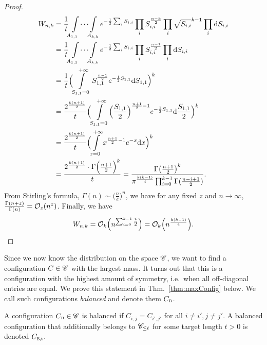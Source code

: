 \begin{proof}
	\begin{align*}
		W_{n,k} &= \frac{1}{t} \idotsint\limits_{A_{1,1}\hspace{1.3em}A_{k,k}} e^{-\frac12\sum_i S_{i,i}} \prod_i S_{i,i}^{\frac{n-k}{2}} \prod_i\sqrt{S_{i,i}}^{k-1}\prod_i \mathrm{d} S_{i,i} \\
		&=\frac{1}{t} \idotsint\limits_{A_{1,1}\hspace{1.3em}A_{k,k}}e^{-\frac12\sum_i S_{i,i}} \prod_i S_{i,i}^{\frac{n-1}{2}}\prod_i \mathrm{d} S_{i,i} \\
		&=\frac{1}{t} \Bigl( \int\limits_{S_{1,1}=0}^{+ \infty} S_{1,1}^{\frac{n-1}{2}} e^{-\frac12 S_{1,1}} \mathrm{d} S_{1,1}\Bigr)^k \\
		&=\frac{2^{\frac{k(n+1)}{2}}}{t} \Bigl( \int\limits_{S_{1,1}=0}^{+ \infty} \Bigl( \frac{S_{1,1}}{2} \Bigr)^{\frac{n+1}{2} - 1} e^{-\frac12 S_{1,1}} \mathrm{d} \frac{S_{1,1}}{2}\Bigr)^k \\
		&=\frac{2^{\frac{k(n+1)}{2}}}{t} \Bigl( \int\limits_{x=0}^{+ \infty} x^{\frac{n+1}{2}-1} e^{-x} \mathrm{d} x \Bigr)^k \\
		&=\frac{2^{\frac{k(n+1)}{2}} \cdot \Gamma \Bigl( \frac{n+1}{2} \Bigr)^k}{t}
		=\frac{\Gamma \bigl( \frac{n+1}{2} \bigr)^k}{\pi^{\frac{k(k-1)}{4}} \prod_{i=0}^{k-1} \Gamma(\frac{n-i+1}{2} )}.
	\end{align*}
	From Stirling's formula, $\Gamma(n) \sim \bigl( \tfrac{n}{e} \bigr)^n$, we have for any fixed $z$ and $n \rightarrow \infty$, $\frac{\Gamma(n+z)}{\Gamma(n)} = \mathcal{O}_z(n^z)$. Finally, we have
	\[
		W_{n,k} = \mathcal{O}_k \Bigl( n^{\sum_{i=0}^{k-1} \tfrac{i}{2}}\Bigr) = \mathcal{O}_k \Bigl( n^{\frac{k(k-1)}{4}} \Bigr).
	\]
\end{proof}

Since we now know the distribution on the space $\mathscr{C}$, we want to find a configuration $C \in \mathscr{C}$ with the largest mass. It turns out that this is a configuration with the highest amount of symmetry, i.e.\ when all off-diagonal entries are equal. We prove this statement in Thm.~\ref{thm:maxConfig} below. We call such configurations \emph{balanced} and denote them $\Cbal$.

\begin{definition} \label{def:BalancedConfig}
 A configuration $\Cbal \in \ConfSpace$ is balanced if $C_{i,j} = C_{i', j'}$ for all $i \neq i', j \neq j'$. A balanced configuration that additionally belongs to $\mathscr{C}_{\leq t}$ for some target length $t>0$ is denoted $\Cbalt$.
\end{definition} 

